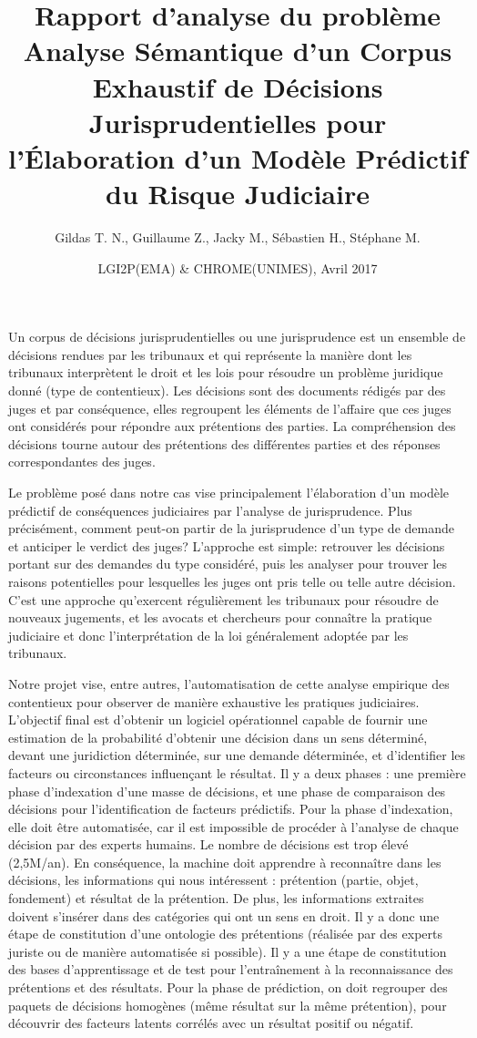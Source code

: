\documentclass[12pt,a4paper,oneside]{article}
\author{Gildas T. N., Guillaume Z., Jacky M., Sébastien H., Stéphane M.}
\title{\textbf{Rapport d'analyse du problème \\ \vspace{0.5cm} \normalsize \og Analyse Sémantique d'un Corpus Exhaustif de Décisions Jurisprudentielles pour l'Élaboration d'un Modèle Prédictif du Risque Judiciaire \fg{} }}
\date{LGI2P(EMA) \& CHROME(UNIMES), Avril 2017}
\begin{document}
\nocite{}

\maketitle

Un corpus de décisions jurisprudentielles ou une jurisprudence est un ensemble de décisions rendues par les tribunaux et qui représente la manière dont les tribunaux interprètent le droit et les lois pour résoudre un problème juridique donné (type de contentieux). Les décisions sont des documents rédigés par des juges et par conséquence, elles regroupent les éléments de l'affaire que ces juges ont considérés pour répondre aux prétentions des parties. La compréhension des décisions tourne autour des prétentions des différentes parties et des réponses correspondantes des juges.

Le problème posé dans notre cas vise principalement l'élaboration d'un modèle prédictif de conséquences judiciaires par l'analyse de jurisprudence. Plus précisément, comment peut-on partir de la jurisprudence d'un type de demande et anticiper le verdict des juges? L'approche est simple: retrouver les décisions portant sur des demandes du type considéré, puis les analyser pour trouver les raisons potentielles pour lesquelles les juges ont pris telle ou telle autre décision. C'est une approche qu'exercent régulièrement les tribunaux pour résoudre de nouveaux jugements, et les avocats et chercheurs pour connaître la pratique judiciaire et donc l'interprétation de la loi généralement adoptée par les tribunaux.

Notre projet vise, entre autres, l'automatisation de cette analyse empirique des contentieux pour observer de manière exhaustive les pratiques judiciaires. L'objectif final est d'obtenir un logiciel opérationnel capable de fournir une estimation de la probabilité d'obtenir une décision dans un sens déterminé, devant une juridiction déterminée, sur une demande déterminée, et d'identifier les facteurs ou circonstances influençant le résultat.
Il y a deux phases : une première phase d'indexation d'une masse de décisions, et une phase de comparaison des décisions pour l'identification de facteurs prédictifs.
Pour la phase d'indexation, elle doit être automatisée, car il est impossible de procéder à l'analyse de chaque décision par des experts humains. Le nombre de décisions est trop élevé (2,5M/an). En conséquence, la machine doit apprendre à reconnaître dans les décisions, les informations qui nous intéressent : prétention (partie, objet, fondement) et résultat de la prétention. De plus, les informations extraites doivent s'insérer dans des catégories qui ont un sens en droit. Il y a donc une étape de constitution d'une ontologie des prétentions (réalisée par des experts juriste ou de manière automatisée si possible). Il y a une étape de constitution des bases d'apprentissage et de test pour l'entraînement à la reconnaissance des prétentions et des résultats.
Pour la phase de prédiction, on doit regrouper des paquets de décisions homogènes (même résultat sur la même prétention), pour découvrir des facteurs latents corrélés avec un résultat positif ou négatif. 
\end{document}
